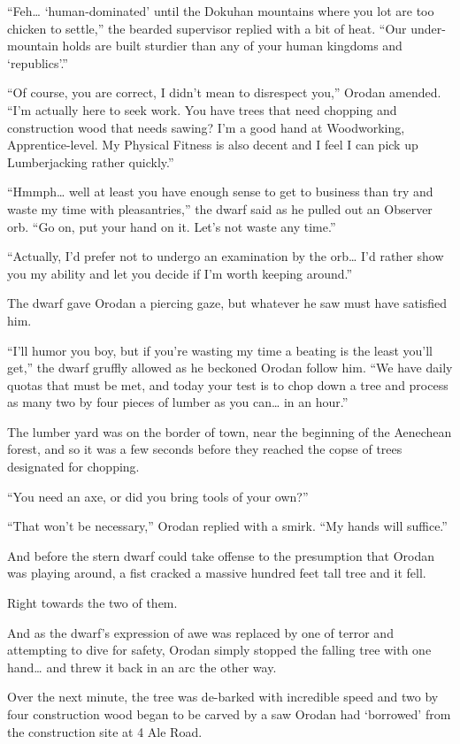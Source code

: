 \documentclass[a4paper,10pt]{book}
\begin{document}
“Feh… ‘human-dominated’ until the Dokuhan mountains where you lot are too chicken to settle,” the bearded supervisor replied with a bit of heat. “Our under-mountain holds are built sturdier than any of your human kingdoms and ‘republics’.”\par
“Of course, you are correct, I didn’t mean to disrespect you,” Orodan amended. “I’m actually here to seek work. You have trees that need chopping and construction wood that needs sawing? I’m a good hand at Woodworking, Apprentice-level. My Physical Fitness is also decent and I feel I can pick up Lumberjacking rather quickly.”\par
“Hmmph… well at least you have enough sense to get to business than try and waste my time with pleasantries,” the dwarf said as he pulled out an Observer orb. “Go on, put your hand on it. Let’s not waste any time.”\par
“Actually, I’d prefer not to undergo an examination by the orb… I’d rather show you my ability and let you decide if I’m worth keeping around.”\par
The dwarf gave Orodan a piercing gaze, but whatever he saw must have satisfied him.\par
“I’ll humor you boy, but if you’re wasting my time a beating is the least you’ll get,” the dwarf gruffly allowed as he beckoned Orodan follow him. “We have daily quotas that must be met, and today your test is to chop down a tree and process as many two by four pieces of lumber as you can… in an hour.”\par
The lumber yard was on the border of town, near the beginning of the Aenechean forest, and so it was a few seconds before they reached the copse of trees designated for chopping.\par
“You need an axe, or did you bring tools of your own?”\par
“That won’t be necessary,” Orodan replied with a smirk. “My hands will suffice.”\par
And before the stern dwarf could take offense to the presumption that Orodan was playing around, a fist cracked a massive hundred feet tall tree and it fell.\par
Right towards the two of them.\par
And as the dwarf’s expression of awe was replaced by one of terror and attempting to dive for safety, Orodan simply stopped the falling tree with one hand… and threw it back in an arc the other way.\par
Over the next minute, the tree was de-barked with incredible speed and two by four construction wood began to be carved by a saw Orodan had ‘borrowed’ from the construction site at 4 Ale Road.\par
\end{document}
